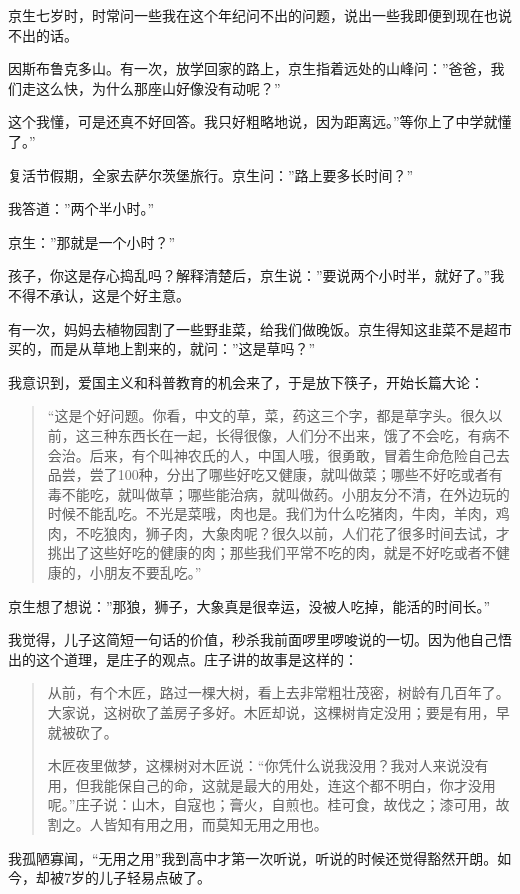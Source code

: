 \documentclass[twoside,openright,headings=optiontohead]{ctexbook} %
\begin{document}
{京生七岁时，时常问一些我在这个年纪问不出的问题，说出一些我即便到现在也说不出的话。

因斯布鲁克多山。有一次，放学回家的路上，京生指着远处的山峰问：''爸爸，我们走这么快，为什么那座山好像没有动呢？''

这个我懂，可是还真不好回答。我只好粗略地说，因为距离远。''等你上了中学就懂了。''

复活节假期，全家去萨尔茨堡旅行。京生问：''路上要多长时间？''

我答道：''两个半小时。''

京生：''那就是一个小时？''

孩子，你这是存心捣乱吗？解释清楚后，京生说：''要说两个小时半，就好了。''我不得不承认，这是个好主意。

有一次，妈妈去植物园割了一些野韭菜，给我们做晚饭。京生得知这韭菜不是超市买的，而是从草地上割来的，就问：''这是草吗？''

我意识到，爱国主义和科普教育的机会来了，于是放下筷子，开始长篇大论：

\begin{quote}
``这是个好问题。你看，中文的草，菜，药这三个字，都是草字头。很久以前，这三种东西长在一起，长得很像，人们分不出来，饿了不会吃，有病不会治。后来，有个叫神农氏的人，中国人哦，很勇敢，冒着生命危险自己去品尝，尝了100种，分出了哪些好吃又健康，就叫做菜；哪些不好吃或者有毒不能吃，就叫做草；哪些能治病，就叫做药。小朋友分不清，在外边玩的时候不能乱吃。不光是菜哦，肉也是。我们为什么吃猪肉，牛肉，羊肉，鸡肉，不吃狼肉，狮子肉，大象肉呢？很久以前，人们花了很多时间去试，才挑出了这些好吃的健康的肉；那些我们平常不吃的肉，就是不好吃或者不健康的，小朋友不要乱吃。''
\end{quote}

京生想了想说：''那狼，狮子，大象真是很幸运，没被人吃掉，能活的时间长。''

我觉得，儿子这简短一句话的价值，秒杀我前面啰里啰唆说的一切。因为他自己悟出的这个道理，是庄子的观点。庄子讲的故事是这样的：

\begin{quote}
从前，有个木匠，路过一棵大树，看上去非常粗壮茂密，树龄有几百年了。大家说，这树砍了盖房子多好。木匠却说，这棵树肯定没用；要是有用，早就被砍了。

木匠夜里做梦，这棵树对木匠说：``你凭什么说我没用？我对人来说没有用，但我能保自己的命，这就是最大的用处，连这个都不明白，你才没用呢。''庄子说：山木，自寇也；膏火，自煎也。桂可食，故伐之；漆可用，故割之。人皆知有用之用，而莫知无用之用也。
\end{quote}

我孤陋寡闻，``无用之用''我到高中才第一次听说，听说的时候还觉得豁然开朗。如今，却被7岁的儿子轻易点破了。

}
\end{document}

